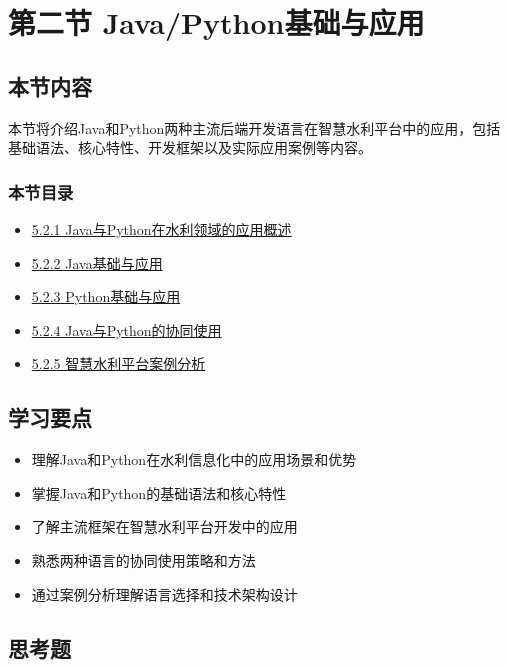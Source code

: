 \section{第二节
Java/Python基础与应用}\label{ux7b2cux4e8cux8282-javapythonux57faux7840ux4e0eux5e94ux7528}

\subsection{本节内容}\label{ux672cux8282ux5185ux5bb9}

本节将介绍Java和Python两种主流后端开发语言在智慧水利平台中的应用，包括基础语法、核心特性、开发框架以及实际应用案例等内容。

\subsubsection{本节目录}\label{ux672cux8282ux76eeux5f55}

\begin{itemize}
\tightlist
\item
  \href{section05-02/section05-02-01.md}{5.2.1
  Java与Python在水利领域的应用概述}
\item
  \href{section05-02/section05-02-02.md}{5.2.2 Java基础与应用}
\item
  \href{section05-02/section05-02-03.md}{5.2.3 Python基础与应用}
\item
  \href{section05-02/section05-02-04.md}{5.2.4 Java与Python的协同使用}
\item
  \href{section05-02/section05-02-05.md}{5.2.5 智慧水利平台案例分析}
\end{itemize}

\subsection{学习要点}\label{ux5b66ux4e60ux8981ux70b9}

\begin{itemize}
\tightlist
\item
  理解Java和Python在水利信息化中的应用场景和优势
\item
  掌握Java和Python的基础语法和核心特性
\item
  了解主流框架在智慧水利平台开发中的应用
\item
  熟悉两种语言的协同使用策略和方法
\item
  通过案例分析理解语言选择和技术架构设计
\end{itemize}

\subsection{思考题}\label{ux601dux8003ux9898}

